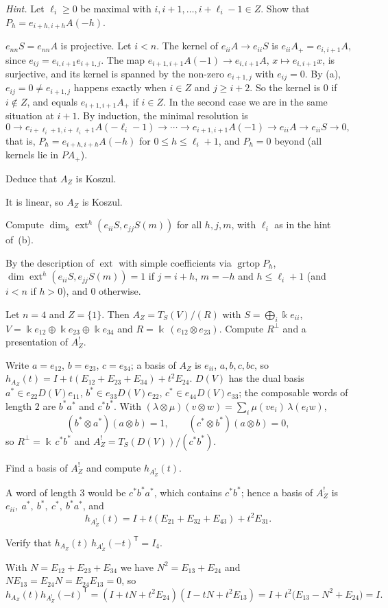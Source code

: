 \documentclass[11pt,a4paper]{exam}
\newcommand{\kk}{\Bbbk}
\DeclareMathOperator{\ext}{ext}
\DeclareMathOperator{\grtop}{grtop}
\begin{document}
\begin{questions}
\begin{parts}
\begin{subparts}
\emph{Hint.} Let $\ell_i\geq0$ be maximal with $i,i+1,\ldots,i+\ell_i-1\in Z$. Show that $P_h=e_{i+h,i+h}A(-h)$.
\begin{solution}
$e_{nn}S=e_{nn}A$ is projective. Let $i<n$.
The kernel of $e_{ii}A\to e_{ii}S$ is $e_{ii}A_+=e_{i,i+1}A$, since $e_{ij}=e_{i,i+1}e_{i+1,j}$.
The map $e_{i+1,i+1}A(-1)\to e_{i,i+1}A$, $x\mapsto e_{i,i+1}x$, is surjective, and its kernel is spanned by the non-zero $e_{i+1,j}$ with $e_{ij}=0$.
By (a), $e_{ij}=0\neq e_{i+1,j}$ happens exactly when $i\in Z$ and $j\geq i+2$.
So the kernel is $0$ if $i\notin Z$, and equals $e_{i+1,i+1}A_+$ if $i\in Z$.
In the second case we are in the same situation at $i+1$.
By induction, the minimal resolution is
\[
0\to e_{i+\ell_i+1,i+\ell_i+1}A(-\ell_i-1)\to\cdots\to e_{i+1,i+1}A(-1)\to e_{ii}A\to e_{ii}S\to0,
\]
that is, $P_h=e_{i+h,i+h}A(-h)$ for $0\leq h\leq\ell_i+1$, and $P_h=0$ beyond (all kernels lie in $PA_+$).
\end{solution}
\subpart Deduce that $A_Z$ is Koszul.
\begin{solution}
It is linear, so $A_Z$ is Koszul.
\end{solution}
\subpart Compute $\dim_\kk\ext^h(e_{ii}S,e_{jj}S(m))$ for all $h,j,m$, with $\ell_i$ as in the hint of~(b).
\begin{solution}
By the description of $\ext$ with simple coefficients via $\grtop P_h$, $\dim\ext^h(e_{ii}S,e_{jj}S(m))=1$ if $j=i+h$, $m=-h$ and $h\leq\ell_i+1$ (and $i<n$ if $h>0$), and $0$ otherwise.
\end{solution}
\subpart Let $n=4$ and $Z=\{1\}$. Then $A_Z=T_S(V)/(R)$ with $S=\bigoplus_i\kk e_{ii}$, $V=\kk e_{12}\oplus\kk e_{23}\oplus\kk e_{34}$ and $R=\kk\,(e_{12}\otimes e_{23})$.
Compute $R^\perp$ and a presentation of $A_Z^!$.
\begin{solution}
Write $a=e_{12}$, $b=e_{23}$, $c=e_{34}$; a basis of $A_Z$ is $e_{ii}$, $a,b,c,bc$, so $h_{A_Z}(t)=I+t(E_{12}+E_{23}+E_{34})+t^2E_{24}$.
$D(V)$ has the dual basis $a^*\in e_{22}D(V)e_{11}$, $b^*\in e_{33}D(V)e_{22}$, $c^*\in e_{44}D(V)e_{33}$; the composable words of length $2$ are $b^*a^*$ and $c^*b^*$.
With $(\lambda\otimes\mu)(v\otimes w)=\sum_i\mu(ve_i)\,\lambda(e_iw)$,
\[
  (b^*\otimes a^*)(a\otimes b)=1,\qquad(c^*\otimes b^*)(a\otimes b)=0,
\]
so $R^\perp=\kk\,c^*b^*$ and $A_Z^!=T_S(D(V))/(c^*b^*)$.
\end{solution}
\subpart Find a basis of $A_Z^!$ and compute $h_{A_Z^!}(t)$.
\begin{solution}
A word of length $3$ would be $c^*b^*a^*$, which contains $c^*b^*$; hence a basis of $A_Z^!$ is $e_{ii},\ a^*,\ b^*,\ c^*,\ b^*a^*$, and
\[
  h_{A_Z^!}(t)=I+t(E_{21}+E_{32}+E_{43})+t^2E_{31}.
\]
\end{solution}
\subpart Verify that $h_{A_Z}(t)\,h_{A_Z^!}(-t)^{\mathsf T}=I_4$.
\begin{solution}
With $N=E_{12}+E_{23}+E_{34}$ we have $N^2=E_{13}+E_{24}$ and $NE_{13}=E_{24}N=E_{24}E_{13}=0$, so
\[
  h_{A_Z}(t)h_{A_Z^!}(-t)^{\mathsf T}=(I+tN+t^2E_{24})(I-tN+t^2E_{13})=I+t^2\bigl(E_{13}-N^2+E_{24}\bigr)=I.
\]
\end{solution}
\end{subparts}
\end{parts}


\end{questions}
\end{document}

